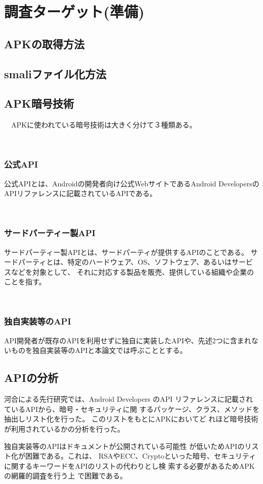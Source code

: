 \newpage
\section{調査ターゲット(準備)}
\subsection {APKの取得方法}
\subsection{smaliファイル化方法}

\subsection{APK暗号技術}
　APKに使われている暗号技術は大きく分けて３種類ある。

　\subsubsection {公式API}
公式APIとは、Androidの開発者向け公式WebサイトであるAndroid DevelopersのAPIリファレンスに記載されているAPIである。

　\subsubsection {サードパーティー製API}
サードパーティー製APIとは、サードパーティが提供するAPIのことである。
サードパーティとは、特定のハードウェア、OS、ソフトウェア、あるいはサービスなどを対象として、
それに対応する製品を販売、提供している組織や企業のことを指す。


　\subsubsection {独自実装等のAPI}
API開発者が既存のAPIを利用せずに独自に実装したAPIや、先述2つに含まれないものを独自実装等のAPIと本論文では呼ぶこととする。

\subsection{APIの分析}
河合による先行研究では、Android Developers のAPI リファレンスに記載されているAPIから、暗号・セキュリティに関
するパッケージ、クラス、メソッドを抽出しリスト化を行った。
このリストをもとにAPKにおいてど
れほど暗号技術が利用されているかの分析を行った。

独自実装等のAPIはドキュメントが公開されている可能性
が低いためAPIのリスト化が困難である。これは、
RSAやECC、Cryptoといった暗号、セキュリティ
に関するキーワードをAPIのリストの代わりとし検
索する必要があるためAPKの網羅的調査を行う上
で困難である。

